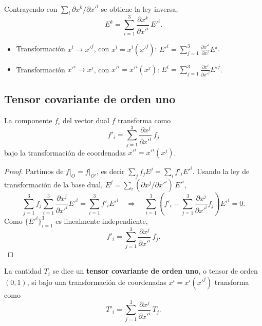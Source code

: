 Contrayendo con $\sum_i \partial x^k/\partial x'^i$ se obtiene la ley inversa,
\begin{equation}
E^k = \sum_{i=1}^3 \frac{\partial x^k}{\partial x'^i}\, E'^i .
\end{equation}

\begin{observacion}[Resumen]
\begin{itemize}
\item Transformación $x^i\to x'^j$, con $x^i=x^i(x'^j)$: \quad $\displaystyle E'^i = \sum_{j=1}^3\frac{\partial x'^i}{\partial x^j}E^j$.
\item Transformación $x'^i\to x^j$, con $x'^i=x'^i(x^j)$: \quad $\displaystyle E^i = \sum_{j=1}^3\frac{\partial x^i}{\partial x'^j}E'^j$.
\end{itemize}
\end{observacion}

\subsection{Tensor covariante de orden uno}

\begin{proposicion}
La componente $f_i$ del vector dual $f$ transforma como
\begin{equation}
f'_i = \sum_{j=1}^3 \frac{\partial x^j}{\partial x'^i}\, f_j
\end{equation}
bajo la transformación de coordenadas $x'^i=x'^i(x^j)$.
\end{proposicion}

\begin{proof}
Partimos de $f\big|_O = f\big|_{O'}$, es decir $\sum_j f_j E^j = \sum_i f'_i E'^i$. Usando la ley de transformación de la base dual, $E^j = \sum_i (\partial x^j/\partial x'^i)\,E'^i$,
\begin{equation}
\sum_{j=1}^3 f_j \sum_{i=1}^3 \frac{\partial x^j}{\partial x'^i}E'^i = \sum_{i=1}^3 f'_i E'^i
\quad\Longrightarrow\quad
\sum_{i=1}^3\left(f'_i - \sum_{j=1}^3 \frac{\partial x^j}{\partial x'^i}f_j\right)E'^i = 0 .
\end{equation}
Como $\{E'^i\}_{i=1}^3$ es linealmente independiente,
\begin{equation}
f'_i = \sum_{j=1}^3 \frac{\partial x^j}{\partial x'^i}\, f_j .
\end{equation}
\end{proof}

\begin{definicion}
La cantidad $T_i$ se dice un \textbf{tensor covariante de orden uno}, o tensor de orden $(0,1)$, si bajo una transformación de coordenadas $x^i=x^i(x'^j)$ transforma como
\begin{equation}
T'_i = \sum_{j=1}^3 \frac{\partial x^j}{\partial x'^i}\, T_j .
\end{equation}
\end{definicion}

